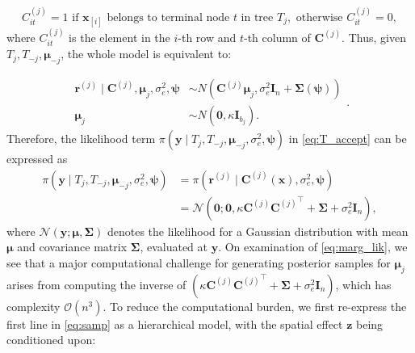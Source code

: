 \documentclass{article}
\begin{document}
$$C^{(j)}_{it} =  1 \text{ if } \boldsymbol{x}_{[i]} \text{ belongs to terminal node } t \text{ in tree } T_j, \text{ otherwise } C^{(j)}_{it} = 0,$$ 
where $C^{(j)}_{it}$ is the element in the $i$-th row and $t$-th column of ${\mathbf{C}^{(j)}}$. Thus, given $T_j, T_{-j}, \boldsymbol{\mu}_{-j}$, the whole model is equivalent to:
{

\begin{equation} 
\begin{aligned}
\boldsymbol{r}^{(j)} \mid {\mathbf{C}^{(j)}} , \boldsymbol{\mu}_j, \sigma_e^2, \boldsymbol{\psi} &\sim N\left({\mathbf{C}^{(j)}} \boldsymbol{\mu}_j, \sigma_e^2\mathbf{I}_{n} + \mathbf{\Sigma}(\boldsymbol{\psi}) \right) \\
	\boldsymbol{\mu}_j  &\sim N(\boldsymbol{0}, \kappa\mathbf{I}_{b_j}).
\end{aligned}
\label{eq:samp}.
\end{equation} 
Therefore, the likelihood term $\pi\left(\boldsymbol{y} \mid T_j, T_{-j}, \boldsymbol{\mu}_{-j}, \sigma_e^2, \boldsymbol{\psi}\right)$ in \eqref{eq:T_accept} can be expressed as 
\begin{equation}
\begin{aligned}
\label{eq:marg_lik}
    \pi\left(\boldsymbol{y} \mid T_j, T_{-j}, \boldsymbol{\mu}_{-j}, \sigma_e^2, \boldsymbol{\psi}\right) &= \pi(\boldsymbol{r}^{(j)} \mid {\mathbf{C}^{(j)}} (\boldsymbol{x}), \sigma_e^2, \boldsymbol{\psi}) \\&= \mathcal{N}(\mathbf{0}; \mathbf{0}, \kappa {\mathbf{C}^{(j)}} {\mathbf{C}^{(j)}}^\intercal + \mathbf{\Sigma} + \sigma_e^2 \mathbf{I}_n),
\end{aligned}
\end{equation}
where $\mathcal{N}(\boldsymbol{y} ; \boldsymbol{\mu}, \mathbf{\Sigma})$ denotes the likelihood for a Gaussian distribution with mean $\boldsymbol{\mu}$ and covariance matrix $\mathbf{\Sigma}$, evaluated at $\boldsymbol{y}$. On examination of \eqref{eq:marg_lik}, we see that a major computational challenge for generating posterior samples for $\boldsymbol{\mu}_j$ arises from computing the inverse of $\left(\kappa {\mathbf{C}^{(j)}} {\mathbf{C}^{(j)}}^\intercal + \mathbf{\Sigma} + \sigma_e^2 \mathbf{I}_n\right)$, which has complexity $\mathcal{O}(n^3)$.
To reduce the computational burden, we first re-express the first line in \eqref{eq:samp} as a hierarchical model, with the spatial effect $\boldsymbol{z}$ being conditioned upon:
\begin{equation} 
\begin{aligned}

\end{aligned}
\end{equation}}
\end{document}
